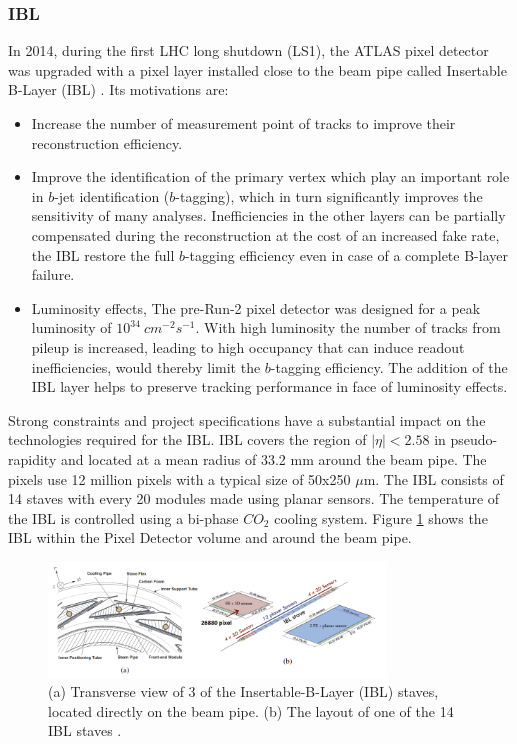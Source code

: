 \subsubsection{IBL}
\label{chap2:ATLAS:ITK:IBL}
In 2014, during the first LHC long shutdown (LS1), the ATLAS pixel detector was upgraded with a pixel layer installed close to the beam pipe called Insertable B-Layer (IBL) \cite{IBL_TDR}. Its motivations are:
\begin{itemize}
    \item Increase the number of measurement point of tracks to improve their reconstruction efficiency.
	\item Improve the identification of the primary vertex which play an important role in $b$-jet identification ($b$-tagging), which in turn significantly improves the sensitivity of many analyses. Inefficiencies in the other layers can be partially compensated during the reconstruction at the cost of an increased fake rate, the IBL restore the full $b$-tagging efficiency even in case of a complete B-layer failure.
	\item Luminosity effects, The pre-Run-2 pixel detector was designed for a peak luminosity of $10^{34} \ cm^{-2}s^{-1}$. With high luminosity the number of tracks from pileup is increased, leading to high occupancy that can induce readout inefficiencies, would thereby limit the $b$-tagging efficiency. The addition of the IBL layer helps to preserve tracking performance in face of luminosity effects.
\end{itemize}
Strong constraints and project specifications have a substantial impact on the technologies required for the IBL. IBL covers the region of $|\eta|< 2.58$ in pseudo-rapidity and located at a mean radius of 33.2 mm around the beam pipe. The pixels use 12 million pixels with a typical size of 50x250 $\mu$m. The IBL consists of 14 staves with every 20 modules made using planar sensors. The temperature of the IBL is controlled using a bi-phase $CO_2$ cooling system. Figure \ref{fig:chap2:ATLAS:ITK:IBL} shows the IBL within the Pixel Detector volume and around the beam pipe.
\begin{figure}[htbp]
    \centering
    \includegraphics[width=0.8\textwidth]{Ch2/Img/IBL.png}
    \caption{(a) Transverse view of 3 of the Insertable-B-Layer (IBL) staves, located directly on the beam pipe. (b) The layout of one of the 14 IBL staves \cite{ID_withIBL}.}
    \label{fig:chap2:ATLAS:ITK:IBL}
\end{figure}

